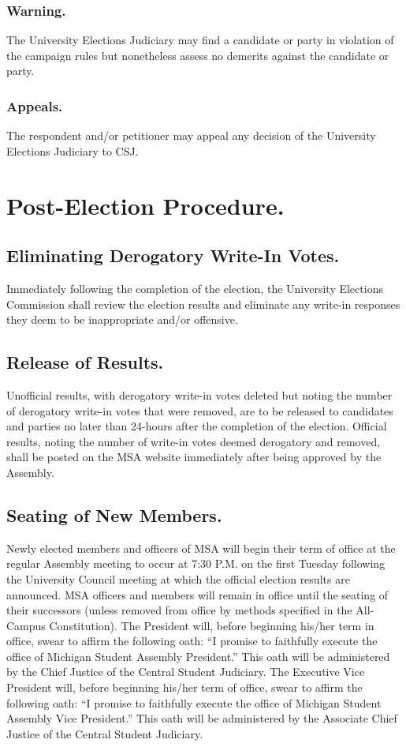 \subsubsection{Warning.}
The University Elections Judiciary may find a candidate or party in violation of the campaign rules but nonetheless assess no demerits against the candidate or party.

\subsubsection{Appeals.}
The respondent and/or petitioner may appeal any decision of the University Elections Judiciary to CSJ.  


\section{Post-Election Procedure.}
\subsection{Eliminating Derogatory Write-In Votes.}
Immediately following the completion of the election, the University Elections Commission shall review the election results and eliminate any write-in responses they deem to be inappropriate and/or offensive.
\subsection{Release of Results.}
Unofficial results, with derogatory write-in votes deleted but noting the number of derogatory write-in votes that were removed, are to be released to candidates and parties no later than 24-hours after the completion of the election. Official results, noting the number of write-in votes deemed derogatory and removed, shall be posted on the MSA website immediately after being approved by the Assembly.
\subsection{Seating of New Members.}
Newly elected members and officers of MSA will begin their term of office at the regular Assembly meeting to occur at 7:30 P.M. on the first Tuesday following the University Council meeting at which the official election results are announced.  MSA officers and members will remain in office until the seating of their successors (unless removed from office by methods specified in the All-Campus Constitution).  The President will, before beginning his/her term in office, swear to affirm the following oath: ``I promise to faithfully execute the office of Michigan Student Assembly President.''  This oath will be administered by the Chief Justice of the Central Student Judiciary.  The Executive Vice President will, before beginning his/her term of office, swear to affirm the following oath: ``I promise to faithfully execute the office of Michigan Student Assembly Vice President.''  This oath will be administered by the Associate Chief Justice of the Central Student Judiciary.
